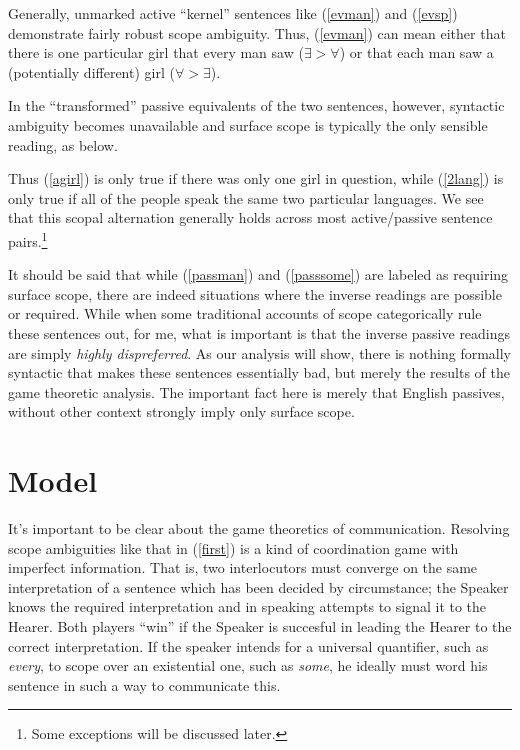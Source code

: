 \documentclass{article}
\begin{document}
Generally, unmarked active ``kernel'' sentences like (\ref{evman}) and (\ref{evsp}) demonstrate fairly robust scope ambiguity.
Thus, (\ref{evman}) can mean either that there is one particular girl that every man saw ($\exists>\forall$) or that each man saw a (potentially different) girl ($\forall>\exists$).

In the ``transformed'' passive equivalents of the two sentences, however, syntactic ambiguity becomes unavailable and surface scope is typically the only sensible reading, as below.

\begin{exe}
\end{exe}

Thus (\ref{agirl}) is only true if there was only one girl in question, while (\ref{2lang}) is only true if all of the people speak the same two particular languages.
We see that this scopal alternation generally holds across most active/passive sentence pairs.\footnote{Some exceptions will be discussed later.}

It should be said that while (\ref{passman}) and (\ref{passsome}) are labeled as requiring surface scope, there are indeed situations where the inverse readings are possible or required.
While when some traditional accounts of scope categorically rule these sentences out, for me, what is important is that the inverse passive readings are simply \emph{highly dispreferred}.
As our analysis will show, there is nothing formally syntactic that makes these sentences essentially bad, but merely the results of the game theoretic analysis.
The important fact here is merely that English passives, without other context strongly imply only surface scope.


\section{Model}

It's important to be clear about the game theoretics of communication.
Resolving scope ambiguities like that in (\ref{first}) is a kind of coordination game with imperfect information.
That is, two interlocutors must converge on the same interpretation of a sentence which has been decided by circumstance;
the Speaker knows the required interpretation and in speaking attempts to signal it to the Hearer.
Both players ``win'' if the Speaker is succesful in leading the Hearer to the correct interpretation.
If the speaker intends for a universal quantifier, such as \emph{every}, to scope over an existential one, such as \emph{some}, he ideally must word his sentence in such a way to communicate this.
\end{document}
